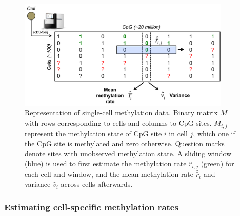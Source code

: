 \begin{figure}[htbp!]
\centering
\includegraphics[width=0.9\textwidth]{method}
\caption[Representation of single-cell methylation data.]{Representation of single-cell methylation data. Binary matrix $M$ with rows corresponding to cells and columns to CpG sites. $M_{i,j}$ represent the methylation state of CpG site $i$ in cell $j$, which one if the CpG site is methylated and zero otherwise. Question marks denote sites with unobserved methylation state. A sliding window (blue) is used to first estimate the methylation rate $\hat{r}_{i,j}$ (green) for each cell and window, and the mean methylation rate $\hat{\bar{r}}_i$ and variance $\hat{v}_i$ across cells afterwards.}
\label{fig:bs_method}
\end{figure}


\newcommand{\Xfw}{c^+}
\newcommand{\Xrv}{c^-}
\newcommand{\Xfws}{s^+_{i,j}}
\newcommand{\Xrvs}{s^-_{i,j}}
\newcommand{\XBin}{\operatorname{Bin}}
\newcommand{\Xse}{\operatorname{SE}}
\newcommand{\Xrij}{\hat{r}_{i,j}}
\newcommand{\Xri}{\hat{r}_i}
\newcommand{\Xwij}{w_{i,j}}
\newcommand{\Xrmi}{\hat{\overline{r}}_i}
\newcommand{\Xrvi}{\hat{v}_i}
\newcommand{\Xrvli}{\hat{v}^l_i}
\newcommand{\Xrvui}{\hat{v}^u_i}
\newcommand{\Xwjji}{w^{j,j^\prime}_i}


\subsubsection{Estimating cell-specific methylation rates}

